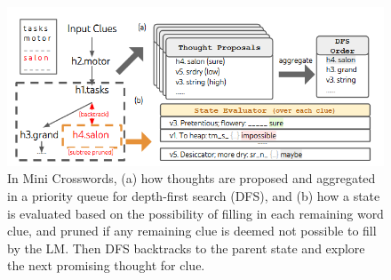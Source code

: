 \documentclass{article}
\begin{document}
\begin{figure}[H]
    \centering
    \includegraphics[width=\textwidth]{./Images/Figure6.png}
    \caption{In Mini Crosswords, (a) how thoughts are proposed and aggregated in a priority queue for depth-first search (DFS), and (b) how a state is evaluated based on the possibility of filling in each remaining word clue, and pruned if any remaining clue is deemed not possible to fill by the LM. Then DFS backtracks to the parent state and explore the next promising thought for clue.}
    \label{fig:Figure6}
\end{figure}
\end{document}
